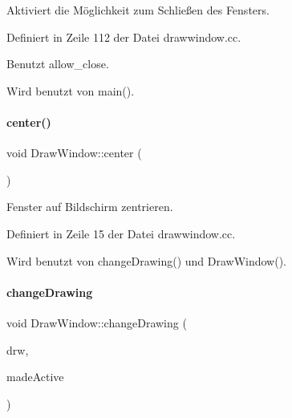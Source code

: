 Aktiviert die Möglichkeit zum Schließen des Fensters. 



Definiert in Zeile 112 der Datei drawwindow.\+cc.



Benutzt allow\+\_\+close.



Wird benutzt von main().

\mbox{\label{classDrawWindow_ac0df14df2085f4bc7d19be0d3b44d2f7}} 
\paragraph{\texorpdfstring{center()}{center()}}
{\footnotesize\ttfamily void Draw\+Window\+::center (\begin{DoxyParamCaption}{ }\end{DoxyParamCaption})\hspace{0.3cm}{\ttfamily [private]}}



Fenster auf Bildschirm zentrieren. 



Definiert in Zeile 15 der Datei drawwindow.\+cc.



Wird benutzt von change\+Drawing() und Draw\+Window().

\mbox{\label{classDrawWindow_a38c094c0d774830ee22b827a4e7e3f31}} 
\paragraph{\texorpdfstring{change\+Drawing}{changeDrawing}}
{\footnotesize\ttfamily void Draw\+Window\+::change\+Drawing (\begin{DoxyParamCaption}\item[{const \mbox{\hyperlink{classDrawing}{Drawing}} $\ast$}]{drw,  }\item[{Q\+Wait\+Condition $\ast$}]{made\+Active }\end{DoxyParamCaption})\hspace{0.3cm}{\ttfamily [slot]}}



